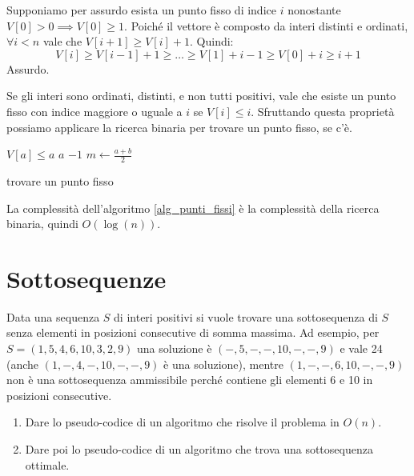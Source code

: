 Supponiamo per assurdo esista un punto fisso di indice $i$ nonostante $V[0] > 0 \implies V[0] \ge 1$. Poich\'e il vettore \`e composto da interi distinti e ordinati, $\forall i < n$ vale che $V[i+1] \ge V[i] + 1$. Quindi:
\[
V[i] \ge V[i-1] + 1 \ge \ldots \ge V[1] + i - 1 \ge V[0] + i \ge i + 1
\]
Assurdo.

Se gli interi sono ordinati, distinti, e non tutti positivi, vale che esiste un punto fisso con indice maggiore o uguale a $i$ se $V[i] \le i$. Sfruttando questa propriet\`a possiamo applicare la ricerca binaria per trovare un punto fisso, se c'\`e.

\begin{algorithm}
\begin{algorithmic}
\Require $V[a] \le a$
            \State \Return $a$
        \Else
            \State \Return $-1$
        \EndIf
    \Else
        \State $m \gets \frac{a + b}{2}$
            \State \Return {}
        \Else
            \State \Return {}
        \EndIf
    \EndIf
\EndFunction
\end{algorithmic}
\caption{\label{alg_punti_fissi}trovare un punto fisso}
\end{algorithm}

La complessit\`a dell'algoritmo \ref{alg_punti_fissi} \`e la complessit\`a della ricerca binaria, quindi $O \left(\log (n) \right)$.

\clearpage

\section{Sottosequenze}

\begin{esercizio}
Data una sequenza $S$ di interi positivi si vuole trovare una sottosequenza di $S$ senza elementi in posizioni consecutive di somma massima. Ad esempio, per $S = (1,5,4,6,10,3,2,9)$ una soluzione \`e $(-,5,-,-,10,-,-,9)$ e vale 24 (anche $(1,-,4,-,10,-,-,9)$ \`e una soluzione), mentre $(1,-,-,6,10,-,-,9)$ non \`e una sottosequenza ammissibile perché contiene gli elementi 6 e 10 in posizioni consecutive.
\begin{enumerate}
    \item Dare lo pseudo-codice di un algoritmo che risolve il problema in $O(n)$.
    \item Dare poi lo pseudo-codice di un algoritmo che trova una sottosequenza ottimale.
\end{enumerate}
\end{esercizio}

